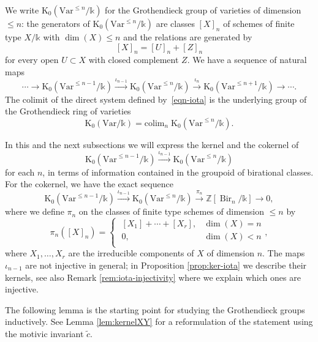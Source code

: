 \documentclass[a4paper,12pt]{amsart}
\def\k{\mathbb k}
\def\Z{\mathbb Z}
\def\Bir{{\operatorname{Bir}}}
\def\Kt{{\mathrm{K}}}
\def\Var{{\mathrm{Var}}}
\theoremstyle{plain}
\numberwithin{equation}{section}
\theoremstyle{definition}
\newcommand{\ti}[1]{\tilde{#1}}
\renewcommand{\(}{\left(}
\renewcommand{\)}{\right)}
\newcommand{\xto}[1]{\xrightarrow{ #1 }}
\begin{document}
We write $\Kt_0(\Var^{\le n}/\k)$ for the Grothendieck
group of varieties of dimension $\le n$: the generators
of $\Kt_0(\Var^{\le n}/\k)$
are
classes $[X]_n$
of schemes of finite type $X/\k$ with $\dim(X) \le n$
and the relations
are generated by
\begin{equation}\label{eq:cut-and-paste}
[X]_n = [U]_n + [Z]_n
\end{equation}
for every open $U \subset X$ with closed complement $Z$.
We have a sequence of natural maps
\begin{equation}\label{eqn-iota}
    \cdots \to \Kt_0(\Var^{\le n-1}/\k) \xto{\iota_{n-1}} \Kt_0(\Var^{\le n}/\k) \xto{\iota_{n}} \Kt_0(\Var^{\le n+1}/\k) \to \cdots.
\end{equation}
The colimit of the direct system defined by~\eqref{eqn-iota}
is the underlying group of 
the Grothendieck ring of varieties
\[
\Kt_0(\Var/\k) = \mathrm{colim}_n \; \Kt_0(\Var^{\le n}/\k).
\]

In this and the next subsections
we will express the kernel and the cokernel of
$$\Kt_0(\Var^{\le n-1}/\k) \xto{\iota_{n-1}} \Kt_0(\Var^{\le n}/\k)$$
for each $n$, 
in terms of information contained in 
the groupoid of birational classes. 
For the cokernel, we have the exact sequence
\begin{equation}\label{eq:K0-seq}
\Kt_0(\Var^{\le n-1}/\k) \overset{\iota_{n-1}}\to \Kt_0(\Var^{\le n}/\k) \overset{\pi_n}\to \Z[\Bir_n/\k] \to 0,
\end{equation}
where 
we define
$\pi_n$ 
on 
the classes of 
finite type schemes
of dimension $\le n$ by
\begin{equation}
\label{eq:def-pi}
\pi_n([X]_n) = \left\{\begin{array}{cc}
     \; [X_1] + \cdots + [X_r], & \dim(X) = n \\
     \; 0, & \dim(X) < n \\
\end{array}\right.,
\end{equation}
where $X_1,\ldots,X_r$ are the irreducible components of $X$ of dimension $n$.
The maps $\iota_{n-1}$ are not injective in general;
in Proposition \ref{prop:ker-iota} we describe their kernels,
see also Remark \ref{rem:iota-injectivity} where we explain
which ones are injective.

The following lemma 
is the starting point
for studying the Grothendieck groups inductively.
See Lemma
\ref{lem:kernelXY} 
for a reformulation of the statement using the motivic invariant
$\ti{c}$.
\end{document}
